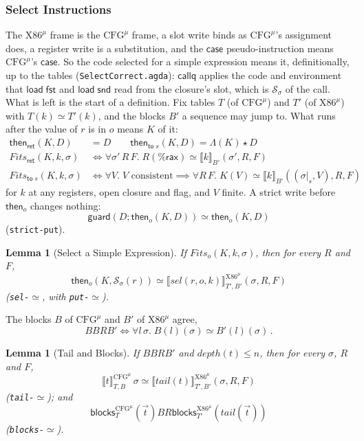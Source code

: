 \documentclass[10pt]{article}
\theoremstyle{acmplain}
\newtheorem{lemma}[theorem]{Lemma}
\newcommand{\SEM}[1]{\llbracket #1 \rrbracket}
\newcommand{\key}[1]{\mathsf{#1}}
\newcommand{\pass}[1]{\mathit{#1}}
\newcommand{\app}{\star}
\newcommand{\rax}{\%\key{rax}}
\newcommand{\Tcut}[2]{#1|_{#2}}                %
\newcommand{\Ml}[1]{\textrm{#1}^{\mu}}                  %
\begin{document}
\subsubsection{Select Instructions}

The $\Ml{X86}$ frame is the $\Ml{CFG}$ frame, a slot write binds as
$\Ml{CFG}$'s assignment does, a register write is a substitution, and the
$\key{case}$ pseudo-instruction means $\Ml{CFG}$'s $\key{case}$. So the code
selected for a simple expression means it, definitionally, up to the
tables (\texttt{SelectCorrect.agda}): $\key{callq}$ applies the code and
environment that $\key{load}\;\key{fst}$ and $\key{load}\;\key{snd}$ read
from the closure's slot, which is $\mathcal{S}_\sigma$ of the call. What is
left is the start of a definition. Fix tables $T$ (of $\Ml{CFG}$) and $T'$
(of $\Ml{X86}$) with $T(k) \simeq T'(k)$, and the blocks $B'$ a sequence
may jump to. What runs after the value of $r$ is in $o$ means $K$ of it:
\begin{align*}
  \key{then}_{\key{ret}}(K, D) &= D \qquad
  \key{then}_{\key{to}\;s}(K, D) = \Lambda(K) \app D \\
  \mathit{Fits}_{\key{ret}}(K, k, \sigma) &\iff \forall \sigma'\, R\, F.\;
    R(\rax) \simeq \SEM{k}_{B'}(\sigma', R, F) \\
  \mathit{Fits}_{\key{to}\;s}(K, k, \sigma) &\iff \forall V.\; V \text{ consistent} \implies
    \forall R\, F.\; K(V) \simeq \SEM{k}_{B'}((\Tcut{\sigma}{s}, V), R, F)
\end{align*}
for $k$ at any registers, open closure and flag, and $V$ finite. A strict
write before $\key{then}_o$ changes nothing:
\[ \key{guard}(D; \key{then}_o(K, D)) \simeq \key{then}_o(K, D) \]
(\texttt{strict-put}).
\begin{lemma}[Select a Simple Expression]\label{lem:m-den-sel}
If $\mathit{Fits}_o(K, k, \sigma)$, then for every $R$ and $F$,
\[ \key{then}_o(K, \mathcal{S}_\sigma(r)) \simeq \SEM{\pass{sel}(r, o, k)}^{\Ml{X86}}_{T',B'}(\sigma, R, F) \]
(\texttt{sel-$\simeq$}, with \texttt{put-$\simeq$}).
\end{lemma}
The blocks $B$ of $\Ml{CFG}$ and $B'$ of $\Ml{X86}$ agree,
\[ B \mathrel{\mathit{BR}} B' \iff \forall l\, \sigma.\; B(l)(\sigma) \simeq B'(l)(\sigma)\,. \]
\begin{lemma}[Tail and Blocks]\label{lem:m-den-sel-tail}
If $B \mathrel{\mathit{BR}} B'$ and $\mathit{depth}(t) \leq n$, then for every $\sigma$, $R$ and $F$,
\[ \SEM{t}^{\Ml{CFG}}_{T,B}\,\sigma \simeq \SEM{\pass{tail}(t)}^{\Ml{X86}}_{T',B'}(\sigma, R, F) \]
(\texttt{tail-$\simeq$}); and
\[ \key{blocks}^{\Ml{CFG}}_{T}(\vec{t}) \mathrel{\mathit{BR}} \key{blocks}^{\Ml{X86}}_{T'}(\pass{tail}(\vec{t})) \]
(\texttt{blocks-$\simeq$}).
\end{lemma}
\end{document}
